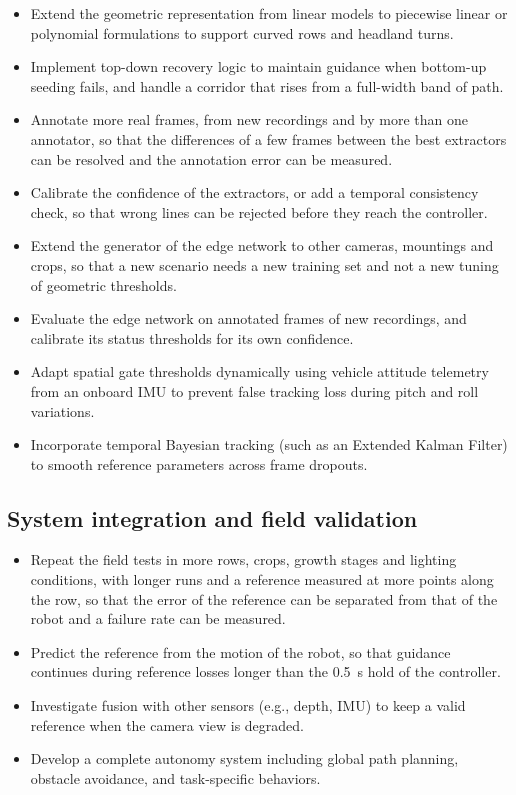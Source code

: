 \begin{itemize}
\item Extend the geometric representation from linear models to piecewise linear or polynomial formulations to support curved rows and headland turns.
\item Implement top-down recovery logic to maintain guidance when bottom-up seeding fails, and handle a corridor that rises from a full-width band of path.
\item Annotate more real frames, from new recordings and by more than one annotator, so that the differences of a few frames between the best extractors can be resolved and the annotation error can be measured.
\item Calibrate the confidence of the extractors, or add a temporal consistency check, so that wrong lines can be rejected before they reach the controller.
\item Extend the generator of the edge network to other cameras, mountings and crops, so that a new scenario needs a new training set and not a new tuning of geometric thresholds.
\item Evaluate the edge network on annotated frames of new recordings, and calibrate its status thresholds for its own confidence.
\item Adapt spatial gate thresholds dynamically using vehicle attitude telemetry from an onboard IMU to prevent false tracking loss during pitch and roll variations.
\item Incorporate temporal Bayesian tracking (such as an Extended Kalman Filter) to smooth reference parameters across frame dropouts.
\end{itemize}

\subsection{System integration and field validation}
\label{subsec:future_integration}

\begin{itemize}
\item Repeat the field tests in more rows, crops, growth stages and lighting conditions, with longer runs and a reference measured at more points along the row, so that the error of the reference can be separated from that of the robot and a failure rate can be measured.
\item Predict the reference from the motion of the robot, so that guidance continues during reference losses longer than the 0.5~s hold of the controller.
\item Investigate fusion with other sensors (e.g., depth, IMU) to keep a valid reference when the camera view is degraded.
\item Develop a complete autonomy system including global path planning, obstacle avoidance, and task-specific behaviors.
\end{itemize}

